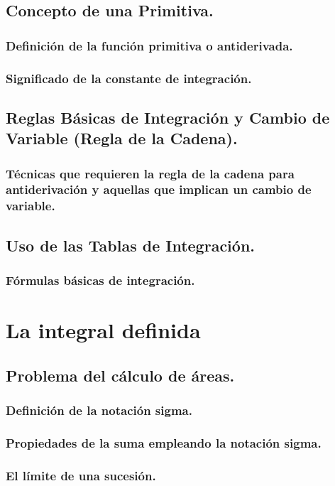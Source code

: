 \subsection{Concepto de una Primitiva.}
\subsubsection{Definición de la función primitiva o antiderivada.}
\subsubsection{Significado de la constante de integración.}
\subsection{Reglas Básicas de Integración y Cambio de Variable (Regla de la Cadena).}
\subsubsection{Técnicas que  requieren la regla de la cadena para antiderivación y aquellas que implican un cambio de variable.}
\subsection{Uso de las Tablas de  Integración.}
\subsubsection{Fórmulas básicas de integración.}




\section{La integral definida} %
\subsection{Problema del cálculo de áreas.}
\subsubsection{Definición de la notación sigma.}
\subsubsection{Propiedades de la suma empleando la notación sigma.}
\subsubsection{El límite de una sucesión.}
